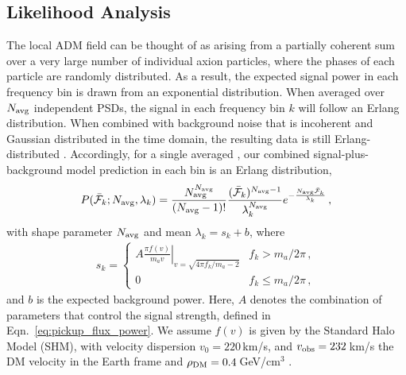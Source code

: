 \documentclass[aps,prd,amsmath,amssymb,reprint,superscriptaddress, nofootinbib,
]{revtex4-1}
\begin{document}
\subsection{Likelihood Analysis}
\label{sec:Likelihood}

The local ADM field can be thought of as arising from a partially coherent sum over a very large number of individual axion particles, where the phases of each particle are randomly distributed. As a result, the expected signal power in each frequency bin is drawn from an exponential distribution. When averaged over $N_{\rm avg}$ independent PSDs, the signal in each frequency bin $k$ will follow an Erlang distribution. When combined with background noise that is incoherent and Gaussian distributed in the time domain, the resulting \PSD data is still Erlang-distributed \cite{Foster2018}. Accordingly, for a single averaged \PSD, our combined signal-plus-background model prediction in each bin is an Erlang distribution,
\begin{equation}
 P(\bar{\mathcal{F}}_k; N_{\rm avg}, \lambda_k) 
 = \frac{N_{\rm avg}^{N_{\rm avg}}}{(N_{\rm avg}-1)!} \frac{(\bar{\mathcal{F}}_k)^{N_{\rm avg}-1}}{\lambda_k^{N_{\rm avg}}} 
 e^{-\frac{N_{\rm avg} \bar{\mathcal{F}}_k}{\lambda_k}}\,,
\end{equation}
with shape parameter $N_{\rm avg}$ and mean $\lambda_k = s_k + b$, where
\begin{eqnarray}
s_k = 
\left\{ \begin{array}{lc}
A \left. \frac{\pi f(v)}{m_a v} \right|_{v = \sqrt{4\pi f_k/m_a - 2}} & f_k > m_a/2\pi\,, \\
0 & f_k \leq m_a/2\pi\,,
\end{array} \right.
\label{eq:skdef}
\end{eqnarray}
and $b$ is the expected background power. Here, $A$ denotes the combination of parameters that control the signal strength, defined in Eqn.~\ref{eq:pickup_flux_power}. We assume $f(v)$ is given by the Standard Halo Model (SHM), with velocity dispersion $v_0 = 220$\,km/s, and $v_{\rm obs} = 232$\,km/s the DM velocity in the Earth frame \cite{McMillan:2009yr} and $\rho_{\rm DM}=0.4$\,GeV/cm$^3$ \cite{Catena:2009mf,Iocco:2011jz}.
\end{document}
